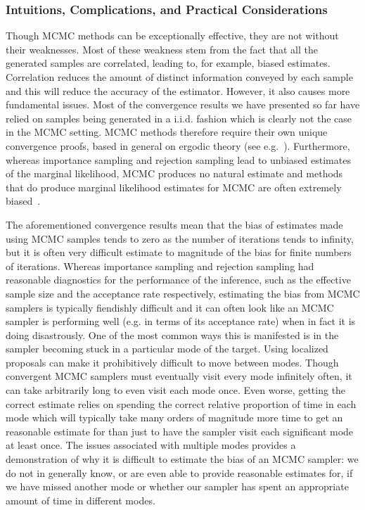 \subsubsection{Intuitions, Complications, and Practical Considerations}
\label{sec:inf:foundation:mcmc:intuitions}

Though MCMC methods can be exceptionally effective, they are not without their weaknesses.
Most of these weakness stem from the fact that all the generated samples are correlated, leading to, for
example, biased estimates.  
Correlation reduces the amount of distinct information conveyed by 
each sample and this will reduce the accuracy of the estimator.  However, it also causes more fundamental
issues.
Most of the convergence results we have presented so far have relied on samples being generated in a i.i.d. 
fashion which is clearly not the case in the MCMC setting.  MCMC methods therefore require their own
unique convergence proofs, based in general on ergodic theory (see e.g.~\cite[Chapter 6]{durrett2010probability}).
Furthermore, whereas importance sampling and rejection sampling lead to
unbiased estimates of the marginal likelihood, MCMC produces no natural estimate and methods
that do produce marginal likelihood estimates for MCMC are often extremely biased~\citep{chib2001marginal}.

The aforementioned convergence results mean that the bias of estimates made using MCMC samples tends to zero
as the number of iterations tends to infinity, but it is often very difficult estimate to magnitude of the bias for
finite numbers of iterations.  Whereas importance sampling and rejection sampling had reasonable
diagnostics for the performance of the inference, such as the effective sample size and the acceptance
rate respectively, estimating the bias from MCMC samplers is typically fiendishly difficult and it can
often look like an MCMC sampler is performing well (e.g. in terms of its acceptance rate) when in fact it is doing disastrously.  
One of the most common ways this is manifested is in the sampler becoming stuck in a particular 
mode of the target.  Using localized proposals can make
it prohibitively difficult to move between modes.  Though convergent MCMC samplers must eventually
visit every mode infinitely often, it can take arbitrarily long to even visit each mode once.  Even worse,
getting the correct estimate relies on spending the correct relative proportion of time in each mode which
will typically take many orders of magnitude more time to get an reasonable estimate for than just to
have the sampler visit each significant mode at least once.  The issues associated with multiple modes
provides a demonstration of why it is difficult to estimate the bias of an MCMC sampler: we do not in
generally know, or are even able to provide reasonable estimates for, if we have missed another mode or 
whether our sampler has spent an appropriate amount of time in different modes.

